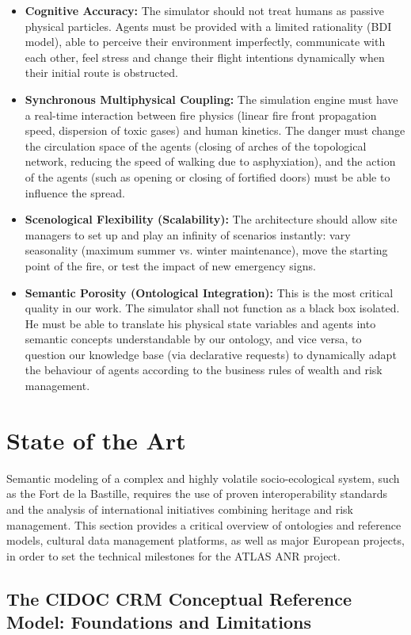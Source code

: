 \documentclass{article}
\begin{document}
\begin{itemize}
\item \textbf {Cognitive Accuracy:} The simulator should not treat humans as passive physical particles. Agents must be provided with a limited rationality (BDI model), able to perceive their environment imperfectly, communicate with each other, feel stress and change their flight intentions dynamically when their initial route is obstructed.
\item \textbf {Synchronous Multiphysical Coupling:} The simulation engine must have a real-time interaction between fire physics (linear fire front propagation speed, dispersion of toxic gases) and human kinetics. The danger must change the circulation space of the agents (closing of arches of the topological network, reducing the speed of walking due to asphyxiation), and the action of the agents (such as opening or closing of fortified doors) must be able to influence the spread.
\item \textbf {Scenological Flexibility (Scalability):} The architecture should allow site managers to set up and play an infinity of scenarios instantly: vary seasonality (maximum summer vs. winter maintenance), move the starting point of the fire, or test the impact of new emergency signs.
\item \textbf {Semantic Porosity (Ontological Integration):} This is the most critical quality in our work. The simulator shall not function as a black box isolated. He must be able to translate his physical state variables and agents into semantic concepts understandable by our ontology, and vice versa, to question our knowledge base (via declarative requests) to dynamically adapt the behaviour of agents according to the business rules of wealth and risk management.
\end{itemize}

\clearpage
\section{State of the Art}
Semantic modeling of a complex and highly volatile socio-ecological system, such as the Fort de la Bastille, requires the use of proven interoperability standards and the analysis of international initiatives combining heritage and risk management. This section provides a critical overview of ontologies and reference models, cultural data management platforms, as well as major European projects, in order to set the technical milestones for the ATLAS ANR project.
\subsection{The CIDOC CRM Conceptual Reference Model: Foundations and Limitations}
\label{subsec:cidoc_crm_approfondi}
\end{document}
